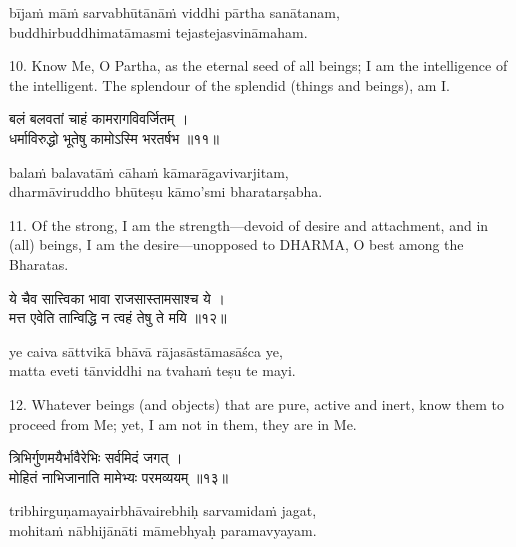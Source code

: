 \begin{transliteration}
bījaṁ māṁ sarvabhūtānāṁ viddhi pārtha sanātanam, \\
buddhirbuddhimatāmasmi tejastejasvināmaham.
\end{transliteration}

10. Know Me, O Partha, as the eternal seed of all beings; I am the intelligence
of the intelligent. The splendour of the splendid (things and beings), am I.\@

\begin{gitaverse}
बलं बलवतां चाहं कामरागविवर्जितम् । \\
धर्माविरुद्धो भूतेषु कामोऽस्मि भरतर्षभ ॥११॥
\end{gitaverse}

\begin{transliteration}
balaṁ balavatāṁ cāhaṁ kāmarāgavivarjitam, \\
dharmāviruddho bhūteṣu kāmo'smi bharatarṣabha.
\end{transliteration}

11. Of the strong, I am the strength---devoid of desire and attachment, and in
(all) beings, I am the desire---unopposed to DHARMA, O best among the Bharatas.

\begin{gitaverse}
ये चैव सात्त्विका भावा राजसास्तामसाश्च ये । \\
मत्त एवेति तान्विद्धि न त्वहं तेषु ते मयि ॥१२॥
\end{gitaverse}

\begin{transliteration}
ye caiva sāttvikā bhāvā rājasāstāmasāśca ye, \\
matta eveti tānviddhi na tvahaṁ teṣu te mayi.
\end{transliteration}

12. Whatever beings (and objects) that are pure, active and inert, know them to
proceed from Me; yet, I am not in them, they are in Me.

\begin{gitaverse}
त्रिभिर्गुणमयैर्भावैरेभिः सर्वमिदं जगत् । \\
मोहितं नाभिजानाति मामेभ्यः परमव्ययम् ॥१३॥
\end{gitaverse}

\begin{transliteration}
tribhirguṇamayairbhāvairebhiḥ sarvamidaṁ jagat, \\
mohitaṁ nābhijānāti māmebhyaḥ paramavyayam.
\end{transliteration}

